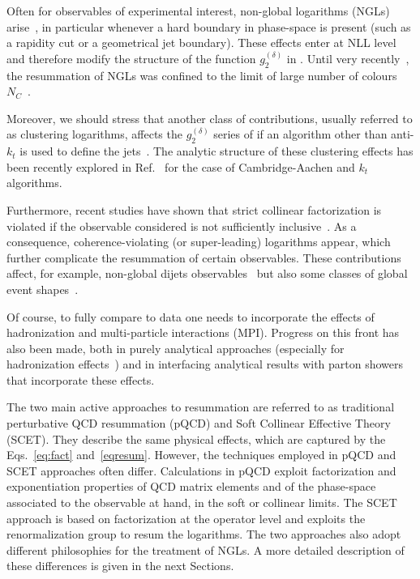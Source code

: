 Often for observables of experimental interest, non-global logarithms (NGLs) 
arise~\cite{Dasgupta:2001sh}, in particular whenever a hard boundary in 
phase-space is present (such as a rapidity cut or a geometrical jet boundary). 
These effects enter at NLL level and therefore modify the structure of the 
function $g_2^{(\delta)}$ in . Until very recently~\cite{Hatta:2013iba}, 
the resummation of NGLs was confined to the limit of large number of 
colours $N_C$~\cite{Dasgupta:2001sh,Dasgupta:2002bw,Banfi:2002hw}. 

Moreover, we should stress that another class of contributions, usually 
referred to as clustering logarithms, affects the $g_2^{(\delta)}$ series 
of  if an algorithm other than anti-$k_t$ is used to define the 
jets~\cite{Banfi:2005gj,Delenda:2006nf}. The analytic structure of these 
clustering effects has been recently explored in 
Ref.~\cite{Kelley:2012zs,Delenda:2012mm} for the case of Cambridge-Aachen 
and $k_t$ algorithms.
 
Furthermore, recent studies have shown that strict collinear factorization is violated if the observable considered is not sufficiently inclusive~\cite{Catani:2011st,Forshaw:2012bi}. As a consequence, coherence-violating (or super-leading) logarithms appear, which further complicate the resummation of certain observables. These contributions affect, for example, non-global dijets observables~\cite{Kyrieleis:2005dt,Forshaw:2008cq} but also some classes of global event shapes~\cite{Banfi:2010xy}.


Of course, to fully compare 
to data one needs to incorporate the effects of hadronization and 
multi-particle interactions (MPI). Progress on this front has also 
been made, both in purely analytical approaches (especially for 
hadronization effects~\cite{Mateu:2012nk}) and in interfacing analytical 
results with parton showers that incorporate these effects.

The two main active approaches to resummation are referred to as traditional 
perturbative QCD resummation (pQCD) and Soft Collinear Effective Theory (SCET).
They describe the same physical effects, which are captured by the 
Eqs.~\ref{eq:fact} and~\ref{eqresum}. However, the techniques employed in pQCD and SCET 
approaches often differ. Calculations in pQCD exploit factorization 
and exponentiation properties of QCD matrix elements and of the 
phase-space associated to the 
observable at hand, in the soft or collinear limits. The SCET approach 
is based on factorization at the operator level and exploits
the renormalization group to resum the logarithms. The two approaches also 
adopt different philosophies for the treatment of NGLs. A more detailed 
description of these differences is given in the next Sections.

